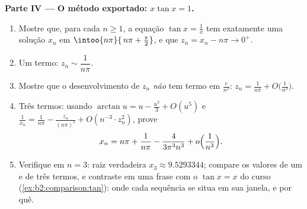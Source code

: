 \begin{problem}
\medskip
\noindent\textbf{Parte IV --- O método exportado: $x\tan x =
1$.}
\begin{enumerate}[resume]
  \item Mostre que, para cada $n \geq 1$, a equação $\tan x =
        \frac1x$ tem exatamente uma solução $x_n$ em
        $\intoo{n\pi}{\,n\pi + \frac\pi2}$, e que $z_n = x_n
        - n\pi \to 0^+$.
  \item Um termo: $z_n \sim \dfrac{1}{n\pi}$.
  \item Mostre que o desenvolvimento de $z_n$ \emph{não} tem
        termo em $\frac{c}{n^2}$: $z_n = \frac1{n\pi} +
        O\bigl(\frac{1}{n^3}\bigr)$.
  \item Três termos: usando $\arctan u = u - \frac{u^3}3 +
        O(u^5)$ e $\frac1{x_n} = \frac{1}{n\pi} -
        \frac{z_n}{(n\pi)^2} + O(n^{-3}\cdot z_n^2)$, prove
        \[
        x_n = n\pi + \frac{1}{n\pi} -
        \frac{4}{3\pi^3 n^3} + o\Bigl(\frac{1}{n^3}\Bigr).
        \]
  \item Verifique em $n = 3$: raiz verdadeira $x_3 \approx 9.5293344$;
        compare os valores de um e de três termos, e contraste em
        uma frase com o $\tan x = x$ do curso
        (\cref{ex:b2:comparison:tan}): onde cada sequência se situa
        em sua janela, e por quê.
\end{enumerate}


\end{problem}
